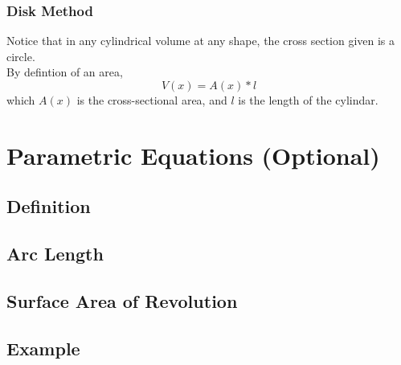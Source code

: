 \documentclass{article}
\begin{document}
\subsubsection{Disk Method}
Notice that in any cylindrical volume at any shape, the cross section given is a circle.\\
By defintion of an area, 
\begin{equation*}
  V(x) = A(x) * l
\end{equation*}
which $A(x)$ is the cross-sectional area, and $l$ is the length of the cylindar.
\section{Parametric Equations (Optional)}
\subsection{Definition}
\subsection{Arc Length}
\subsection{Surface Area of Revolution}
\subsection{Example}
\end{document}
